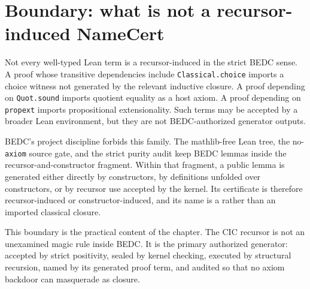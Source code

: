 \section{Boundary: what is not a recursor-induced NameCert}
\label{sec:recursor-boundary-not-induced}

Not every well-typed Lean term is a recursor-induced \NameCert{} in the strict BEDC sense. A proof whose transitive dependencies include \texttt{Classical.choice} imports a choice witness not generated by the relevant inductive closure. A proof depending on \texttt{Quot.sound} imports quotient equality as a host axiom. A proof depending on \texttt{propext} imports propositional extensionality. Such terms may be accepted by a broader Lean environment, but they are not BEDC-authorized generator outputs.

BEDC's project discipline forbids this family. The mathlib-free Lean tree, the no-\texttt{axiom} source gate, and the strict purity audit keep BEDC lemmas inside the recursor-and-constructor fragment. Within that fragment, a public lemma is generated either directly by constructors, by definitions unfolded over constructors, or by recursor use accepted by the kernel. Its certificate is therefore recursor-induced or constructor-induced, and its name is a \NameCert{} rather than an imported classical closure.

This boundary is the practical content of the chapter. The CIC recursor is not an unexamined magic rule inside BEDC. It is the primary authorized generator: accepted by strict positivity, sealed by kernel checking, executed by structural recursion, named by its generated proof term, and audited so that no axiom backdoor can masquerade as closure.

